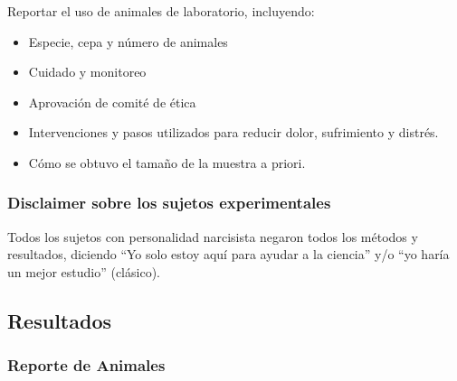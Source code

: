 \documentclass[
  10pt]{article}
\providecommand{\tightlist}{%
  \setlength{\itemsep}{0pt}\setlength{\parskip}{0pt}}\usepackage{longtable,booktabs,array}
\begin{document}
\begin{tcolorbox}
\end{tcolorbox}

\begin{tcolorbox}[enhanced jigsaw, colframe=quarto-callout-tip-color-frame, bottomtitle=1mm, toptitle=1mm, left=2mm, arc=.35mm, toprule=.15mm, colback=white, coltitle=black, leftrule=.75mm, breakable, opacityback=0, titlerule=0mm, title=\textcolor{quarto-callout-tip-color}{\faLightbulb}\hspace{0.5em}{Animales de Laboratorio}, rightrule=.15mm, opacitybacktitle=0.6, bottomrule=.15mm, colbacktitle=quarto-callout-tip-color!10!white]

Reportar el uso de animales de laboratorio, incluyendo:

\begin{itemize}
\tightlist
\item
  Especie, cepa y número de animales
\item
  Cuidado y monitoreo
\item
  Aprovación de comité de ética
\item
  Intervenciones y pasos utilizados para reducir dolor, sufrimiento y
  distrés.
\item
  Cómo se obtuvo el tamaño de la muestra a priori.
\end{itemize}

\end{tcolorbox}

\subsubsection{Disclaimer sobre los sujetos
experimentales}\label{disclaimer-sobre-los-sujetos-experimentales}

Todos los sujetos con personalidad narcisista negaron todos los métodos
y resultados, diciendo ``Yo solo estoy aquí para ayudar a la ciencia''
y/o ``yo haría un mejor estudio'' (clásico).

\subsection{Resultados}\label{resultados}

\subsubsection{Reporte de Animales}\label{reporte-de-animales}
\end{document}
